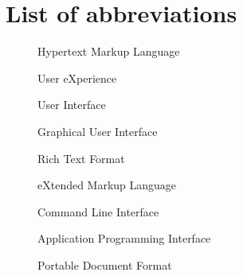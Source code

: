 \chapter*{List of abbreviations}

\begin{multicols}{2}
    \raggedright
    \begin{description}
        \item [] Hypertext Markup Language
        \item [] User eXperience
        \item [] User Interface
        \item [] Graphical User Interface
        \item [] Rich Text Format
        \item [] eXtended Markup Language
        \item [] Command Line Interface
        \item [] Application Programming Interface
        \item [] Portable Document Format
    \end{description}
\end{multicols}

